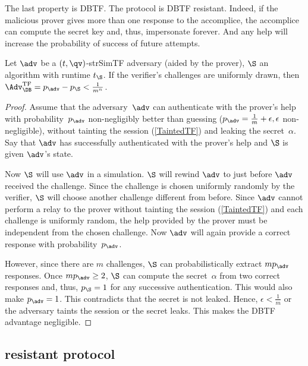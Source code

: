 The last property is \ac{DBTF}.
The protocol is \ac{DBTF} resistant.
Indeed, if the malicious prover gives more than one response to the accomplice, 
the accomplice can compute the secret key and, thus, impersonate forever.
And any help will increase the probability of success of future attempts.

\begin{theorem}
  Let \(\adv\) be a \((t, \qv)\)-strSimTF adversary (aided by the prover), 
  \(\S\) an algorithm with runtime \(t_{\S}\).
  If the verifier's challenges are uniformly drawn, then 
  \(\Adv_{\DB}^{\text{TF}} = p_{\adv} - p_{\S} < \frac{1}{m^n}\).
\end{theorem}

\begin{proof}
  Assume that the adversary~\(\adv\) can authenticate with the prover's help 
  with probability~\(p_{\adv}\) non-negligibly better than guessing (\(p_{\adv} 
  = \frac{1}{m}+\epsilon, \epsilon\) non-negligible), without tainting the 
  session (\cref{TaintedTF}) and leaking the secret~\(\alpha\).
  Say that \(\adv\) has successfully authenticated with the prover's help and 
  \(\S\) is given \(\adv\)'s state.

  Now \(\S\) will use \(\adv\) in a simulation.
  \(\S\) will rewind \(\adv\) to just before \(\adv\) received the challenge.
  Since the challenge is chosen uniformly randomly by the verifier, \(\S\) will 
  choose another challenge different from before.
  Since \(\adv\) cannot perform a relay to the prover without tainting the 
  session (\cref{TaintedTF}) and each challenge is uniformly random, the help 
  provided by the prover must be independent from the chosen challenge.
  Now \(\adv\) will again provide a correct response with 
  probability~\(p_{\adv}\).

  However, since there are \(m\) challenges, \(\S\) can probabilistically extract 
  \(m p_{\adv}\) responses.
  Once \(m p_{\adv} \geq 2\), \(\S\) can compute the secret~\(\alpha\) from two 
  correct responses and, thus, \(p_{\S} = 1\) for any successive 
  authentication.
  This would also make \(p_{\adv} = 1\).
  This contradicts that the secret is not leaked.
  Hence, \(\epsilon < \frac{1}{m}\) or the adversary taints the session or the 
  secret leaks.
  This makes the \ac{DBTF} advantage negligible.
\end{proof}

\subsection{ resistant protocol}

